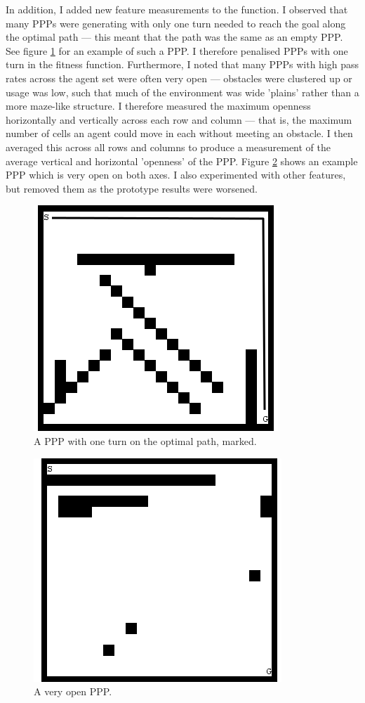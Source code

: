 \documentclass[authoryearcitations]{UoYCSproject}
\begin{document}
In addition, I added new feature measurements to the function. I observed that many PPPs were generating with only one turn needed to reach the goal along the optimal path --- this meant that the path was the same as an empty PPP. See figure \ref{fig:one_turn_ppp} for an example of such a PPP. I therefore penalised PPPs with one turn in the fitness function. Furthermore, I noted that many PPPs with high pass rates across the agent set were often very open --- obstacles were clustered up or usage was low, such that much of the environment was wide 'plains' rather than a more maze-like structure. I therefore measured the maximum openness horizontally and vertically across each row and column --- that is, the maximum number of cells an agent could move in each without meeting an obstacle. I then averaged this across all rows and columns to produce a measurement of the average vertical and horizontal 'openness' of the PPP. Figure \ref{fig:open_ppp} shows an example PPP which is very open on both axes. I also experimented with other features, but removed them as the prototype results were worsened.

\begin{figure}
\graphicspath{ {DesignImpPics/} }
\includegraphics[scale=0.65]{oneTurn.png}
\caption{ A PPP with one turn on the optimal path, marked.}
\label{fig:one_turn_ppp}
\end{figure}

\begin{figure}
\graphicspath{ {DesignImpPics/} }
\includegraphics[scale=0.65]{wide_plain.png}
\caption{ A very open PPP.}
\label{fig:open_ppp}
\end{figure}
\end{document}
